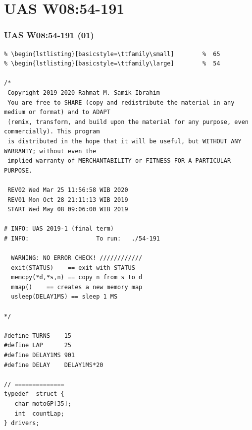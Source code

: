\documentclass[aspectratio=169, xcolor=table, notheorems, hyperref={pdfpagelabels=false}]{beamer}
\begin{document}
\section{UAS W08:54-191}
\begin{frame}[fragile]
\frametitle{UAS W08:54-191 (01)}
\begin{lstlisting}[basicstyle=\ttfamily\tiny]         % 108
% \begin{lstlisting}[basicstyle=\ttfamily\footnotesize] %  72
% \begin{lstlisting}[basicstyle=\ttfamily\small]        %  65
% \begin{lstlisting}[basicstyle=\ttfamily\large]        %  54

/*
 Copyright 2019-2020 Rahmat M. Samik-Ibrahim
 You are free to SHARE (copy and redistribute the material in any medium or format) and to ADAPT 
 (remix, transform, and build upon the material for any purpose, even commercially). This program
 is distributed in the hope that it will be useful, but WITHOUT ANY WARRANTY; without even the 
 implied warranty of MERCHANTABILITY or FITNESS FOR A PARTICULAR PURPOSE.

 REV02 Wed Mar 25 11:56:58 WIB 2020
 REV01 Mon Oct 28 21:11:13 WIB 2019
 START Wed May 08 09:06:00 WIB 2019

# INFO: UAS 2019-1 (final term)
# INFO:                   To run:   ./54-191 

  WARNING: NO ERROR CHECK! ////////////
  exit(STATUS)    == exit with STATUS
  memcpy(*d,*s,n) == copy n from s to d
  mmap()    == creates a new memory map
  usleep(DELAY1MS) == sleep 1 MS

*/

#define TURNS    15
#define LAP      25
#define DELAY1MS 901
#define DELAY    DELAY1MS*20

// ==============
typedef  struct {
   char motoGP[35];
   int  countLap;
} drivers;

\end{lstlisting}
\end{frame}
\end{document}
